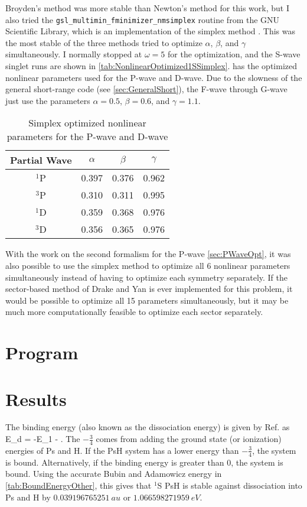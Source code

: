 \documentclass[Dissertation.tex]{subfiles}
\begin{document}
Broyden's method was more stable than Newton's method for this work, but I also tried the \texttt{gsl\_multimin\_fminimizer\_nmsimplex} routine from the GNU Scientific Library, which is an implementation of the simplex method \cite{GSL,GSLsimplex}. This was the most stable of the three methods tried to optimize $\alpha$, $\beta$, and $\gamma$ simultaneously. I normally stopped at $\omega = 5$ for the optimization, and the S-wave singlet runs are shown in \cref{tab:NonlinearOptimized1SSimplex}.  has the optimized nonlinear parameters used for the P-wave and D-wave. Due to the slowness of the general short-range code (see \cref{sec:GeneralShort}), the F-wave through G-wave just use the parameters $\alpha = 0.5$, $\beta = 0.6$, and $\gamma = 1.1$.

\begin{table}[H]
\small
\centering
\begin{tabular}{c c c c}
\toprule
Partial Wave & $\alpha$ & $\beta$ & $\gamma$ \\
\midrule
$^1$P & 0.397 & 0.376 & 0.962 \\
$^3$P & 0.310 & 0.311 & 0.995 \\
$^1$D & 0.359 & 0.368 & 0.976 \\
$^3$D & 0.356 & 0.365 & 0.976 \\
\bottomrule
\end{tabular}
\caption{Simplex optimized nonlinear parameters for the P-wave and D-wave}
\label{tab:NonlinearOptimizedPD}
\end{table}

With the work on the second formalism for the P-wave \cref{sec:PWaveOpt}, it was also possible to use the simplex method to optimize all 6 nonlinear parameters simultaneously instead of having to optimize each symmetry separately. If the sector-based method of Drake and Yan \cite{Yan1995} is ever implemented for this problem, it would be possible to optimize all 15 parameters simultaneously, but it may be much more computationally feasible to optimize each sector separately.


\section{Program}


\section{Results}

The binding energy (also known as the dissociation energy) is given by Ref. \cite{Page1974} as
\beq
\label{eq:DissociationE}
E_d = -E_1 -  .
\eeq
The $-\frac{3}{4}$ comes from adding the ground state (or ionization) energies of Ps and H. If the PsH system has a lower energy than $-\frac{3}{4}$, the system is bound. 
Alternatively, if the binding energy is greater than 0, the system is bound.
Using the accurate Bubin and Adamowicz energy in \cref{tab:BoundEnergyOther}, this gives that $^1$S PsH is stable against dissociation into Ps and H by $\SI{0.039 196 765 251}{au}$ or $\SI{1.066 598 271 959}{eV}$. 
\end{document}
